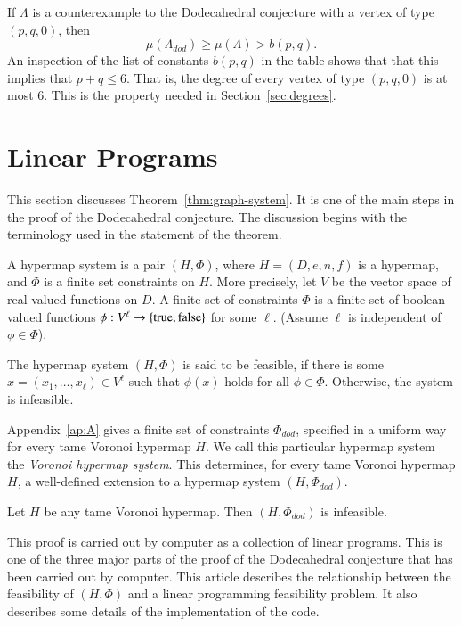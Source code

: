 If $\Lambda$ is a counterexample to the Dodecahedral conjecture with a vertex
of type $(p,q,0)$, then
$$\mu(\Lambda_{dod}) \ge \mu(\Lambda) > b(p,q).$$
An inspection of the list of constants $b(p,q)$ in the table shows that that this implies
that $p+q\le 6$.  That is, the degree of every vertex of type $(p,q,0)$
is at most $6$.  This
is the property needed in Section~\ref{sec:degrees}.



\section{Linear Programs}

This section discusses Theorem~\ref{thm:graph-system}.  It is one of
the main steps in the proof of the Dodecahedral conjecture.
The discussion begins with the terminology used in the
statement of the theorem.


\begin{definition} A hypermap system is a pair $(H,\Phi)$,
where $H=(D,e,n,f)$ is a hypermap, and $\Phi$ is a finite set constraints on $H$.  More precisely, let $V$ be the vector space of
real-valued functions on $D$.  A finite set of constraints $\Phi$ is a finite
set of boolean valued functions $\phi:V^\ell\to \{{\operatorname{true}},{\operatorname{false}}\}$
for some $\ell$. (Assume $\ell$ is independent of $\phi\in \Phi$).
\end{definition}

The hypermap system $(H,\Phi)$ is said to be feasible, if
there is some $x=(x_1,\ldots,x_\ell)\in V^\ell$ such that
$\phi(x)$ holds for all $\phi\in\Phi$. Otherwise,  
the system is infeasible.

Appendix~\ref{ap:A} gives a finite set of constraints $\Phi_{dod}$, 
specified
in a uniform way for every tame Voronoi hypermap $H$.  
We call this particular hypermap system
the {\it Voronoi hypermap system}. 
This determines,
for every tame Voronoi hypermap $H$, a well-defined extension
to a hypermap system $(H,\Phi_{dod})$.   


\begin{theorem}\label{thm:graph-system}  Let 
$H$ be any tame Voronoi hypermap. 
Then $(H,\Phi_{dod})$ is infeasible.
\end{theorem}

This proof is carried out by computer as a collection of linear
programs.  This is one of the three major parts of the proof
of the Dodecahedral conjecture that has been carried out by computer.
This article describes the relationship between the
feasibility of $(H,\Phi)$ and a linear programming feasibility
problem.  It also describes some details of the implementation of 
the code.

